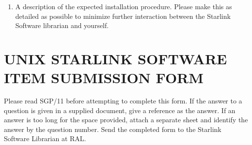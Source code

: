 \begin{enumerate}
\begin{itemize}
\end{itemize}

\item A description of the expected installation procedure. Please make this
as detailed as possible to minimize further interaction between the
Starlink Software librarian and yourself.

\end{enumerate}


\newpage
\small
\appendix
\section {UNIX STARLINK SOFTWARE ITEM SUBMISSION FORM}
Please read SGP/11 before attempting to complete
this form.
If the answer to a question is given in a supplied document, give a reference
as the answer.
If an answer is too long for the space provided, attach a separate sheet and
identify the answer by the question number.
Send the completed form to the Starlink Software Librarian at RAL.

